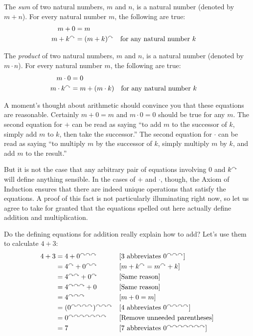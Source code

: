 \begin{defn}\label{def:NatArithmetic}
\noindent The \emph{sum} of two natural numbers, $m$ and $n$, is a natural number (denoted by $m+n$). For every natural number $m$, the following 
are true:
\begin{align*}
    m + 0     &= m\\
    m + k^\curvearrowright &= (m + k)^\curvearrowright &&\text{for any natural number $k$}
\end{align*}

\noindent The \emph{product} of two natural numbers, $m$ and $n$, is a natural number 
(denoted by $m\cdot n$). For every natural number $m$, the following are true:
\begin{align*}
  m\cdot 0 &= 0\\
  m\cdot k^\curvearrowright &= m + (m\cdot k) &&\text{for any natural number $k$}
\end{align*}
\end{defn}


A moment's thought about arithmetic should convince you that these equations are reasonable.
Certainly $m+0=m$ and $m\cdot 0 = 0$ should be true for any $m$. 
The second equation for $+$ can be read as saying ``to add $m$ to the successor of $k$,
simply add $m$ to $k$, then take the successor.'' The second equation for $\cdot$
can be read as saying ``to multiply $m$ by the successor of $k$, simply
multiply $m$ by $k$, and add $m$ to the result.''

But it is not the case that any arbitrary pair of equations involving $0$ and $k^\curvearrowright$
will define anything sensible. In the cases of $+$ and $\cdot$, though, 
the Axiom of Induction ensures that there are indeed unique operations
that satisfy the equations. A proof of this fact is not particularly illuminating
right now, so let us agree to take for granted that the equations 
spelled out here actually define addition and multiplication.

\begin{example}
Do the defining equations for addition really explain how to add? Let's use them to calculate
$4+3$:
\begin{align*}
  4 + 3 &= 4 + 0^{\curvearrowright\curvearrowright\curvearrowright}&&\text{[$3$ abbreviates $0^{\curvearrowright\curvearrowright\curvearrowright}$]}\\
  &= 4^\curvearrowright + 0^{\curvearrowright\curvearrowright} &&\text{[$m + k^\curvearrowright = m^\curvearrowright+k$]}\\
  &= 4^{\curvearrowright\curvearrowright} + 0^\curvearrowright &&\text{[Same reason]}\\
  &= 4^{\curvearrowright\curvearrowright\curvearrowright} + 0 &&\text{[Same reason]}\\
  &= 4^{\curvearrowright\curvearrowright\curvearrowright} &&\text{[$m+0 = m$]}\\
  &= (0^{\curvearrowright\curvearrowright\curvearrowright\curvearrowright})^{\curvearrowright\curvearrowright\curvearrowright} && \text{[$4$ abbreviates $0^{\curvearrowright\curvearrowright\curvearrowright\curvearrowright}$]}\\
  &= 0^{\curvearrowright\curvearrowright\curvearrowright\curvearrowright\curvearrowright\curvearrowright\curvearrowright} && \text{[Remove unneeded parentheses]}\\
  &= 7 &&\text{[$7$ abbreviates $0^{\curvearrowright\curvearrowright\curvearrowright\curvearrowright\curvearrowright\curvearrowright\curvearrowright}$]}
\end{align*}
\end{example}
\ipadbreak


